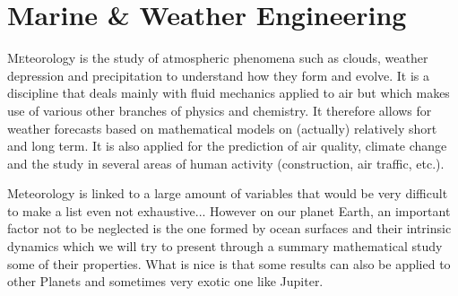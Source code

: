 \section{Marine \& Weather Engineering}\label{meteorology}
	\lettrine[lines=4]{\color{BrickRed}M}eteorology is the study of atmospheric phenomena such as clouds, weather depression and precipitation to understand how they form and evolve. It is a discipline that deals mainly with fluid mechanics applied to air but which makes use of various other branches of physics and chemistry. It therefore allows for weather forecasts based on mathematical models on (actually) relatively short and long term. It is also applied for the prediction of air quality, climate change and the study in several areas of human activity (construction, air traffic, etc.).
	
	Meteorology is linked to a large amount of variables that would be very difficult to make a list even not exhaustive... However on our planet Earth, an important factor not to be neglected is the one formed by ocean surfaces and their intrinsic dynamics which we will try to present through a summary mathematical study some of their properties. What is nice is that some results can also be applied to other Planets and sometimes very exotic one like Jupiter.
	
